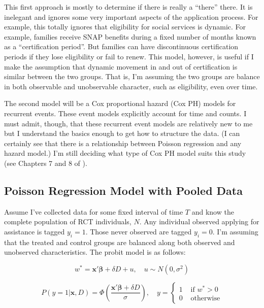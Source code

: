 \documentclass[12pt,letterpaperpaper,]{book}
\begin{document}
This first approach is mostly to determine if there is really a
``there'' there. It is inelegant and ignores some very important aspects
of the application process. For example, this totally ignores that
eligibility for social services is dynamic. For example, families
receive SNAP benefits during a fixed number of months known as a
``certification period''. But families can have discontinuous
certification periods if they lose eligibility or fail to renew. This
model, however, is useful if I make the assumption that dynamic movement
in and out of certification is similar between the two groups. That is,
I'm assuming the two groups are balance in both observable and
unobservable character, such as eligibility, even over time.

The second model will be a Cox proportional hazard (Cox PH) models for
recurrent events. These event models explicitly account for time and
counts. I must admit, though, that these recurrent event models are
relatively new to me but I understand the basics enough to get how to
structure the data. (I can certainly see that there is a relationship
between Poisson regression and any hazard model.) I'm still deciding
what type of Cox PH model suits this study (see Chapters 7 and 8 of
\citet{aalen_survival_2008}).

\subsection*{Poisson Regression Model with Pooled
Data}\label{poisson-regression-model-with-pooled-data}

Assume I've collected data for some fixed interval of time \(T\) and
know the complete population of RCT individuals, \(N\). Any individual
observed applying for assistance is tagged \(y_i=1\). Those never
observed are tagged \(y_i=0\). I'm assuming that the treated and control
groups are balanced along both observed and unobserved characteristics.
The probit model is as follows:

\[
w^* = \bm{x'\beta}  + \delta D + u, \quad u \sim N(0, \sigma^2)
\]

\[
P(y=1|\bm{x}, D) = \Phi \left (\frac{\bm{x'\beta}  + \delta D}{\sigma} \right ), \quad
y = \left \{ 
  \begin{array}{cc} 
    1 & \text{ if } w^* > 0 \\ 
    0 & \text{ otherwise}
  \end{array} 
  \right .
\]
\end{document}
